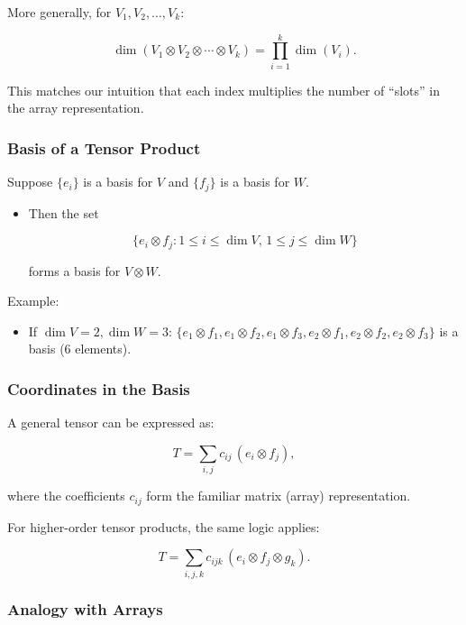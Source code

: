 \documentclass[
  letterpaper,
  DIV=11,
  numbers=noendperiod]{scrreprt}
\providecommand{\tightlist}{%
  \setlength{\itemsep}{0pt}\setlength{\parskip}{0pt}}
\begin{document}
More generally, for \(V_1, V_2, \dots, V_k\):

\[
\dim(V_1 \otimes V_2 \otimes \cdots \otimes V_k) = \prod_{i=1}^k \dim(V_i).
\]

This matches our intuition that each index multiplies the number of
``slots'' in the array representation.

\subsubsection{Basis of a Tensor
Product}\label{basis-of-a-tensor-product}

Suppose \(\{e_i\}\) is a basis for \(V\) and \(\{f_j\}\) is a basis for
\(W\).

\begin{itemize}
\item
  Then the set

  \[
  \{e_i \otimes f_j : 1 \leq i \leq \dim V, \, 1 \leq j \leq \dim W \}
  \]

  forms a basis for \(V \otimes W\).
\end{itemize}

Example:

\begin{itemize}
\tightlist
\item
  If \(\dim V = 2, \dim W = 3\):
  \(\{e_1 \otimes f_1, e_1 \otimes f_2, e_1 \otimes f_3, e_2 \otimes f_1, e_2 \otimes f_2, e_2 \otimes f_3\}\)
  is a basis (6 elements).
\end{itemize}

\subsubsection{Coordinates in the Basis}\label{coordinates-in-the-basis}

A general tensor can be expressed as:

\[
T = \sum_{i,j} c_{ij} \, (e_i \otimes f_j),
\]

where the coefficients \(c_{ij}\) form the familiar matrix (array)
representation.

For higher-order tensor products, the same logic applies:

\[
T = \sum_{i,j,k} c_{ijk} \, (e_i \otimes f_j \otimes g_k).
\]

\subsubsection{Analogy with Arrays}\label{analogy-with-arrays}
\end{document}
